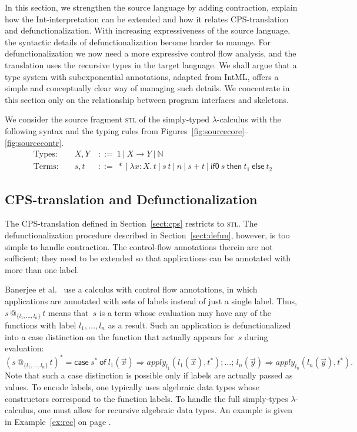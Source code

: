 \documentclass{LMCS}
\makeatletter
\theoremstyle{definition}
\theoremstyle{plain}
\newcommand{\kw}[1]{\mathsf{#1}}
\newcommand{\NN}{\mathbb{N}}
\newcommand{\Capply}{\textit{apply}}
\newcommand{\Mid}{\ \mathrel{\big|} \ }
\newcommand{\tlami}[3]{\lambda {#1}{:}{#2}.\, {#3}}
\newcommand{\tappl}[3]{{#1} {\,@_{#2}\,} {#3}}
\newcommand{\tif}[3]{\kw{if0}\ #1\ \kw{then}\ #2\ \kw{else}\ #3}
\newcommand{\fcase}[5]{\kw{case}\ #1\ \kw{of}\ #2 \Rightarrow #3 ;\, #4 \Rightarrow #5}
\makeatother
\begin{document}
In this section, we strengthen the source language by adding
contraction, explain how the Int-interpretation can be extended 
and how it relates CPS-translation and defunctionalization.
With increasing 
expressiveness of the source language,
the syntactic details of defunctionalization become harder to
manage. For defunctionalization we now need a more expressive control
flow analysis, and the translation uses the recursive types in the 
target language.
We shall argue that a type system with subexponential
annotations, adapted from IntML, offers a simple
and conceptually clear way of 
managing such details.
We concentrate in this section only on the relationship between
program interfaces and skeletons.

We consider the source fragment \textsc{stl} of the simply-typed
$\lambda$-calculus with
the following syntax and the typing rules from
Figures~\ref{fig:sourcecore}--\ref{fig:sourcecontr}.
\begin{align*}
  \text{Types: } && 
  X, Y &\ ::=\  1  \Mid X \to Y \Mid \NN  \\
  \text{Terms: } && s, t  &\ ::=\   * 
  \Mid \tlami x X t \Mid s\ t 
  \Mid n \Mid s+t 
  \Mid \tif s {t_1} {t_2}
\end{align*}

\subsection{CPS-translation and Defunctionalization}

The CPS-translation defined in Section~\ref{sect:cps}
restricts to \textsc{stl}.
The defunctionalization procedure described
in Section~\ref{sect:defun}, however, is too simple to handle
contraction.
The control-flow annotations therein are not sufficient;
they need to be extended so that applications can be annotated with more than one label.

Banerjee et al.~\cite{banerjee} use a calculus with control flow
annotations, in which applications are annotated with sets of labels 
instead of just a single label. 
Thus, $\tappl s {\{l_1,\dots,l_n\}} t$ means that~$s$ is 
a term whose evaluation may have any of the functions with
label $l_1,\dots, l_n$ as a result.
Such an application is defunctionalized into 
a case distinction on the function that actually appears for~$s$ during
evaluation:
\[
(\tappl s {\{l_1,\dots,l_n\}} t)^* = \fcase {s^*} 
{l_1(\vec x)} {\Capply_{l_1}(l_1(\vec x), t^*) ;  \dots} 
{l_n(\vec y)} {\Capply_{l_n}(l_n(\vec y), t^*) }.
\]
Note that such a case distinction is possible only if labels are
actually passed as values.
To encode labels, one typically uses algebraic
data types whose constructors correspond to the function labels. 
To handle the full simply-types $\lambda$-calculus, one must allow for recursive
algebraic data types. An example is given in Example~\ref{ex:rec} on page \pageref{ex:rec}.
\end{document}
